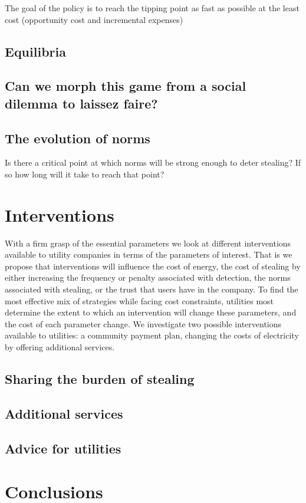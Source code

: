 \documentclass{article}
\begin{document}
The goal of the policy is to reach the tipping point as fast as possible at the least cost (opportunity cost and incremental expenses) 

\subsection{Equilibria}

\subsection{Can we morph this game from a social dilemma to laissez faire?}

\subsection{The evolution of norms}
Is there a critical point at which norms will be strong enough to deter stealing? If so how long will it take to reach that point? 

\section{Interventions}
With a firm grasp of the essential parameters we look at different interventions available to utility companies in terms of the parameters of interest. That is we propose that interventions will influence the cost of energy, the cost of stealing by either increasing the frequency or penalty associated with detection, the norms associated with stealing, or the trust that users have in the company. To find the most effective mix of strategies while facing cost constraints, utilities most determine the extent to which an intervention will change these parameters, and the cost of each parameter change. We investigate two possible interventions available to utilities: a community payment plan, changing the costs of electricity by offering additional services. 

\listoftodos

\subsection{Sharing the burden of stealing}

\subsection{Additional services}

\subsection{Advice for utilities}

\section{Conclusions}
\end{document}
